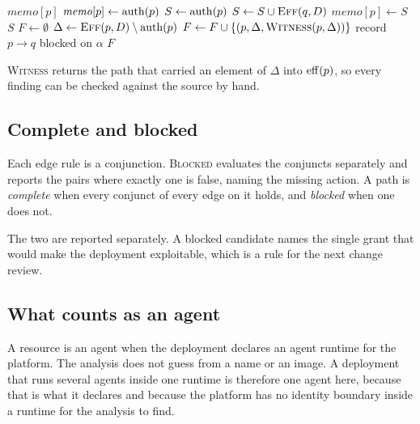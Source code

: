\begin{algorithm}[t]
\caption{Escalation by closure over delegation edges}
\label{alg:reach}
\begin{algorithmic}[1]
   \Return $\mathit{memo}[p]$ \EndIf
  \State $\mathit{memo}[p] \gets \mathrm{auth}(p)$ 
  \State $S \gets \mathrm{auth}(p)$
   
    \State $S \gets S \cup \Call{Eff}{q, D}$
  \EndFor
  \State $\mathit{memo}[p] \gets S$
  \State \Return $S$
\EndFunction
\Statex
{}
  \State $F \gets \emptyset$
    \State $\Delta \gets \Call{Eff}{p, D} \setminus \auth(p)$
    \If{$\Delta \neq \emptyset$}
      \State $F \gets F \cup \{(p, \Delta, \Call{Witness}{p, \Delta})\}$
    \EndIf
      \State record $p \rightarrow q$ blocked on $\alpha$
    \EndFor
  \EndFor
  \State \Return $F$
\EndFunction
\end{algorithmic}
\end{algorithm}

\textsc{Witness} returns the path that carried an element of $\Delta$ into
$\mathrm{eff}(p)$, so every finding can be checked against the source by hand.

\subsection{Complete and blocked}
\label{sec:blocked}

Each edge rule is a conjunction. \textsc{Blocked} evaluates the conjuncts
separately and reports the pairs where exactly one is false, naming the
missing action. A path is \emph{complete} when every conjunct of every edge on
it holds, and \emph{blocked} when one does not.

The two are reported separately. A blocked candidate names the single grant
that would make the deployment exploitable, which is a rule for the next change
review.

\subsection{What counts as an agent}

A resource is an agent when the deployment declares an agent runtime for the
platform. The analysis does not guess from a name or an image. A deployment
that runs several agents inside one runtime is therefore one agent here,
because that is what it declares and because the platform has no identity
boundary inside a runtime for the analysis to find.
